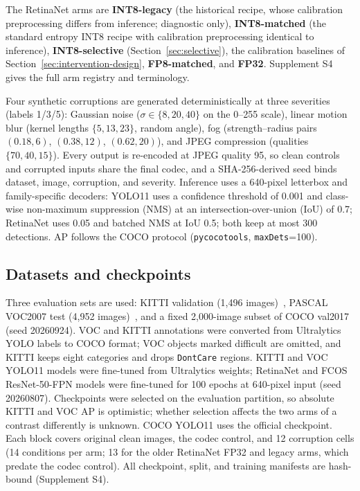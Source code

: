 \documentclass[a4paper,fleqn]{cas-dc}
\begin{document}
The RetinaNet arms are \textbf{INT8-legacy} (the historical recipe, whose calibration preprocessing differs from inference; diagnostic only), \textbf{INT8-matched} (the standard entropy INT8 recipe with calibration preprocessing identical to inference), \textbf{INT8-selective} (Section~\ref{sec:selective}), the calibration baselines of Section~\ref{sec:intervention-design}, \textbf{FP8-matched}, and \textbf{FP32}. Supplement S4 gives the full arm registry and terminology.

Four synthetic corruptions are generated deterministically at three severities (labels 1/3/5): Gaussian noise ($\sigma\in\{8,20,40\}$ on the 0--255 scale), linear motion blur (kernel lengths $\{5,13,23\}$, random angle), fog (strength--radius pairs $(0.18,6)$, $(0.38,12)$, $(0.62,20)$), and JPEG compression (qualities $\{70,40,15\}$). Every output is re-encoded at JPEG quality 95, so clean controls and corrupted inputs share the final codec, and a SHA-256-derived seed binds dataset, image, corruption, and severity. Inference uses a 640-pixel letterbox and family-specific decoders: YOLO11 uses a confidence threshold of 0.001 and class-wise non-maximum suppression (NMS) at an intersection-over-union (IoU) of 0.7; RetinaNet uses 0.05 and batched NMS at IoU 0.5; both keep at most 300 detections. AP follows the COCO protocol (\texttt{pycocotools}, \texttt{maxDets}=100).

\subsection{Datasets and checkpoints}
\label{sec:datasets}

Three evaluation sets are used: KITTI validation (1,496 images)~\citep{geiger2012kitti}, PASCAL VOC2007 test (4,952 images)~\citep{everingham2015voc}, and a fixed 2,000-image subset of COCO val2017~\citep{lin2014coco} (seed 20260924). VOC and KITTI annotations were converted from Ultralytics YOLO labels to COCO format; VOC objects marked difficult are omitted, and KITTI keeps eight categories and drops \texttt{DontCare} regions. KITTI and VOC YOLO11 models were fine-tuned from Ultralytics weights; RetinaNet and FCOS ResNet-50-FPN models were fine-tuned for 100 epochs at 640-pixel input (seed 20260807). Checkpoints were selected on the evaluation partition, so absolute KITTI and VOC AP is optimistic; whether selection affects the two arms of a contrast differently is unknown. COCO YOLO11 uses the official checkpoint. Each block covers original clean images, the codec control, and 12 corruption cells (14 conditions per arm; 13 for the older RetinaNet FP32 and legacy arms, which predate the codec control). All checkpoint, split, and training manifests are hash-bound (Supplement S4).
\end{document}
